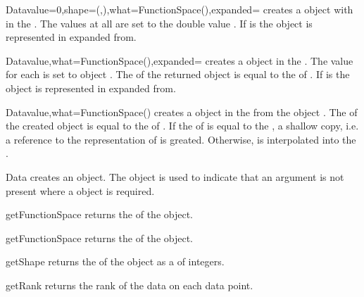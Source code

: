 \begin{classdesc}{Data}{value=0,shape=(,),what=FunctionSpace(),expanded=\False}
creates a \Data object with \Shape {} in the \FunctionSpace {}.
The values at all \DataSamplePoints are set to the double value . If  is \True
the \Data object is represented in expanded from.
\end{classdesc}

\begin{classdesc}{Data}{value,what=FunctionSpace(),expanded=\False}
creates a \Data object in the \FunctionSpace {}. 
The value for each \DataSamplePoints is set to \numarray object . 
The \Shape of the returned object is equal to the \Shape of . If  is \True
the \Data object is represented in expanded from.
\end{classdesc}

\begin{classdesc}{Data}{value,what=FunctionSpace()}
creates a \Data object in the \FunctionSpace {} from the \Data object .
The \Shape of the created \Data object is equal to the \Shape of .
If the \FunctionSpace of  is equal to the , a shallow copy, i.e.
a reference to the representation of  is greated. Otherwise,
 is interpolated into the . 
\end{classdesc}

\begin{classdesc}{Data}{}
creates an \EmptyData object. The \EmptyData object is used to indicate that an argument is not present
where a \Data object is required.
\end{classdesc}

\begin{methoddesc}[Data]{getFunctionSpace}{}
returns the \FunctionSpace of the object.
\end{methoddesc}

\begin{methoddesc}[Data]{getFunctionSpace}{}
returns the \Domain  of the object.
\end{methoddesc}

\begin{methoddesc}[Data]{getShape}{}
returns the \Shape  of the object as a  of
integers.
\end{methoddesc}

\begin{methoddesc}[Data]{getRank}{}
returns the rank of the data on each data point. 
\end{methoddesc}

